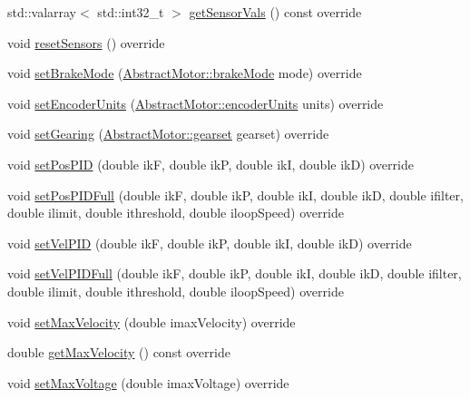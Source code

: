 \begin{DoxyCompactItemize}
std\+::valarray$<$ std\+::int32\+\_\+t $>$ \mbox{\hyperlink{classokapi_1_1SkidSteerModel_a850e4de7ab3a30a354ac39f30a1e8603}{get\+Sensor\+Vals}} () const override
\item 
void \mbox{\hyperlink{classokapi_1_1SkidSteerModel_af8885fc16e654eafa872dd7c760591cf}{reset\+Sensors}} () override
\item 
void \mbox{\hyperlink{classokapi_1_1SkidSteerModel_a84c100815058f4dcdc958b3349713f73}{set\+Brake\+Mode}} (\mbox{\hyperlink{classokapi_1_1AbstractMotor_a132e0485dbb59a60c3f934338d8fa601}{Abstract\+Motor\+::brake\+Mode}} mode) override
\item 
void \mbox{\hyperlink{classokapi_1_1SkidSteerModel_a8922c028a9f09893061938fe50fb2a79}{set\+Encoder\+Units}} (\mbox{\hyperlink{classokapi_1_1AbstractMotor_ae811cd825099f2defadeb1b7f7e7764c}{Abstract\+Motor\+::encoder\+Units}} units) override
\item 
void \mbox{\hyperlink{classokapi_1_1SkidSteerModel_ad890989e345cfd7455436bc5dd6efdcc}{set\+Gearing}} (\mbox{\hyperlink{classokapi_1_1AbstractMotor_a88aaa6ea2fa10f5520a537bbf26774d5}{Abstract\+Motor\+::gearset}} gearset) override
\item 
void \mbox{\hyperlink{classokapi_1_1SkidSteerModel_a17173fd3edc6a2b128a0cdec863e1ef3}{set\+Pos\+P\+ID}} (double ikF, double ikP, double ikI, double ikD) override
\item 
void \mbox{\hyperlink{classokapi_1_1SkidSteerModel_a3e1aba898305edde1732ea3b2f08fb6a}{set\+Pos\+P\+I\+D\+Full}} (double ikF, double ikP, double ikI, double ikD, double ifilter, double ilimit, double ithreshold, double iloop\+Speed) override
\item 
void \mbox{\hyperlink{classokapi_1_1SkidSteerModel_abf2ef82e52b9da670684fb5204ea45cb}{set\+Vel\+P\+ID}} (double ikF, double ikP, double ikI, double ikD) override
\item 
void \mbox{\hyperlink{classokapi_1_1SkidSteerModel_a11fd0eb2d7b0686c364169836fb05359}{set\+Vel\+P\+I\+D\+Full}} (double ikF, double ikP, double ikI, double ikD, double ifilter, double ilimit, double ithreshold, double iloop\+Speed) override
\item 
void \mbox{\hyperlink{classokapi_1_1SkidSteerModel_a4beda353f201fa72fc8d31f47a08d473}{set\+Max\+Velocity}} (double imax\+Velocity) override
\item 
double \mbox{\hyperlink{classokapi_1_1SkidSteerModel_a7e2fcfb65e940ea4d71780966b4b5b68}{get\+Max\+Velocity}} () const override
\item 
void \mbox{\hyperlink{classokapi_1_1SkidSteerModel_ad4dc0f8e3877b23ffb8ae58903bdffb7}{set\+Max\+Voltage}} (double imax\+Voltage) override

\end{DoxyCompactItemize}
